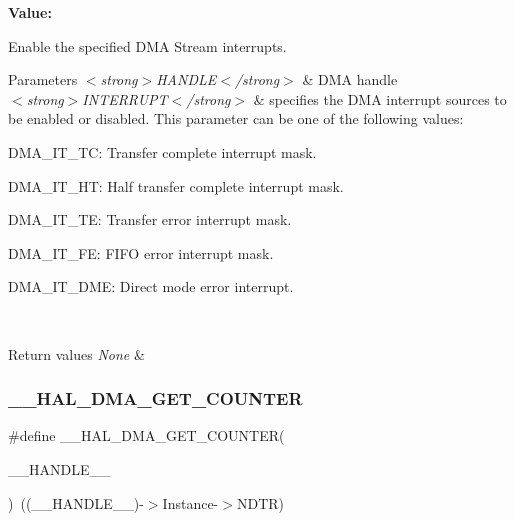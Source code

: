 {\bfseries Value\+:}
\begin{DoxyCode}{0}

\end{DoxyCode}


Enable the specified D\+MA Stream interrupts. 


\begin{DoxyParams}{Parameters}
{\em $<$strong$>$\+H\+A\+N\+D\+L\+E$<$/strong$>$} & D\+MA handle \\
\hline
{\em $<$strong$>$\+I\+N\+T\+E\+R\+R\+U\+P\+T$<$/strong$>$} & specifies the D\+MA interrupt sources to be enabled or disabled. This parameter can be one of the following values\+: \begin{DoxyItemize}
\item D\+M\+A\+\_\+\+I\+T\+\_\+\+TC\+: Transfer complete interrupt mask. \item D\+M\+A\+\_\+\+I\+T\+\_\+\+HT\+: Half transfer complete interrupt mask. \item D\+M\+A\+\_\+\+I\+T\+\_\+\+TE\+: Transfer error interrupt mask. \item D\+M\+A\+\_\+\+I\+T\+\_\+\+FE\+: F\+I\+FO error interrupt mask. \item D\+M\+A\+\_\+\+I\+T\+\_\+\+D\+ME\+: Direct mode error interrupt. \end{DoxyItemize}
\\
\hline
\end{DoxyParams}

\begin{DoxyRetVals}{Return values}
{\em None} & \\
\hline
\end{DoxyRetVals}
\mbox{\label{group___d_m_a_ga082d691311bac96641dc35a17cfe8e63}} 
\subsubsection{\texorpdfstring{\_\_HAL\_DMA\_GET\_COUNTER}{\_\_HAL\_DMA\_GET\_COUNTER}}
{\footnotesize\ttfamily \#define \+\_\+\+\_\+\+H\+A\+L\+\_\+\+D\+M\+A\+\_\+\+G\+E\+T\+\_\+\+C\+O\+U\+N\+T\+ER(\begin{DoxyParamCaption}\item[{}]{\+\_\+\+\_\+\+H\+A\+N\+D\+L\+E\+\_\+\+\_\+ }\end{DoxyParamCaption})~((\+\_\+\+\_\+\+H\+A\+N\+D\+L\+E\+\_\+\+\_\+)-\/$>$Instance-\/$>$N\+D\+TR)}



